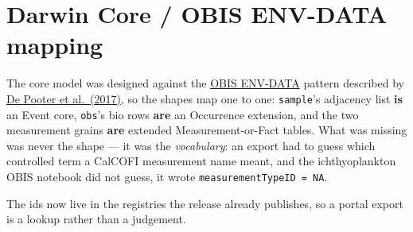 \documentclass[
  letterpaper,
  DIV=11,
  numbers=noendperiod]{scrreprt}
\begin{document}
\section{Darwin Core / OBIS ENV-DATA
mapping}\label{darwin-core-obis-env-data-mapping}

The core model was designed against the
\href{https://doi.org/10.3389/fmars.2018.00251}{OBIS ENV-DATA} pattern
described by \href{https://doi.org/10.3897/BDJ.5.e10989}{De Pooter et
al.~(2017)}, so the shapes map one to one: \texttt{sample}'s adjacency
list \textbf{is} an Event core, \texttt{obs}'s bio rows \textbf{are} an
Occurrence extension, and the two measurement grains \textbf{are}
extended Measurement-or-Fact tables. What was missing was never the
shape --- it was the \emph{vocabulary}: an export had to guess which
controlled term a CalCOFI measurement name meant, and the
ichthyoplankton OBIS notebook did not guess, it wrote
\texttt{measurementTypeID\ =\ NA}.

The ids now live in the registries the release already publishes, so a
portal export is a lookup rather than a judgement.
\end{document}
